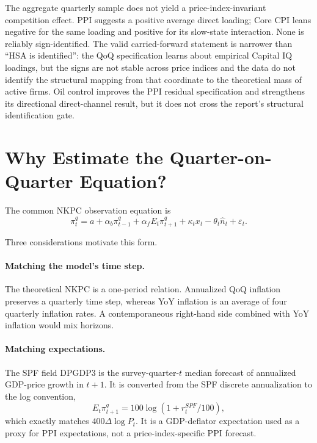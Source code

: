 \documentclass[11pt]{article}
\newcommand{\Nhat}{\hat n}
\begin{document}
The aggregate quarterly sample does not yield a price-index-invariant competition effect.
PPI suggests a positive average direct loading; Core CPI leans negative for the same loading
and positive for its slow-state interaction. None is reliably sign-identified. The valid
carried-forward statement is narrower than ``HSA is identified'': the QoQ specification learns
about empirical Capital IQ loadings, but the signs are not stable across price indices and the
data do not identify the structural mapping from that coordinate to the theoretical mass of
active firms. Oil control improves the PPI residual specification and strengthens its
directional direct-channel result, but it does not cross the report's structural
identification gate.

\section{Why Estimate the Quarter-on-Quarter Equation?}

The common NKPC observation equation is
\begin{equation}
\pi_t^q
=a+\alpha_b\pi_{t-1}^q+\alpha_fE_t\pi_{t+1}^q
+\kappa_t x_t-\theta_t\Nhat_t+\varepsilon_t.
\label{eq:common}
\end{equation}

Three considerations motivate this form.

\paragraph{Matching the model's time step.}
The theoretical NKPC is a one-period relation. Annualized QoQ inflation preserves a
quarterly time step, whereas YoY inflation is an average of four quarterly inflation rates.
A contemporaneous right-hand side combined with YoY inflation would mix horizons.

\paragraph{Matching expectations.}
The SPF field DPGDP3 is the survey-quarter-$t$ median forecast of annualized GDP-price
growth in $t+1$. It is converted from the SPF discrete annualization to the log convention,
\begin{equation}
E_t\pi_{t+1}^q=100\log(1+r_t^{SPF}/100),
\end{equation}
which exactly matches $400\Delta\log P_t$. It is a GDP-deflator expectation used as a proxy
for PPI expectations, not a price-index-specific PPI forecast.
\end{document}
